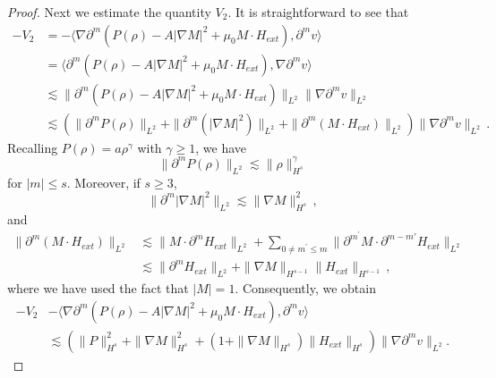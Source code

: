 \documentclass[reqno,11pt]{amsart}
\numberwithin{equation}{section}
\def\no{\nonumber}
\begin{document}
\begin{proof}
Next we estimate the quantity $V_2$. It is straightforward to see that
	\begin{align}\label{v2-eq0}
\no -V_2 & = - \langle \nabla \partial^m (P(\rho) - A |\nabla M|^2 + \mu_0 M \cdot H_{ext}), \partial^m v \rangle \\
\no & = \langle \partial^m (P(\rho) - A |\nabla M|^2 + \mu_0 M \cdot H_{ext}), \nabla \partial^m v \rangle \\
& \lesssim \|\partial^m (P(\rho) - A |\nabla M|^2 + \mu_0 M \cdot H_{ext})\|_{L^2} \|\nabla \partial^m v\|_{L^2} \\
\no & \lesssim \left( \|\partial^m P(\rho)\|_{L^2} + \|\partial^m (|\nabla M|^2)\|_{L^2} + \|\partial^m (M \cdot H_{ext})\|_{L^2} \right) \|\nabla \partial^m v\|_{L^2}\,.
	\end{align}
Recalling $P(\rho)=a\rho^\gamma $ with $ \gamma\geq1$, we have
$$\|\partial^m P(\rho)\|_{L^2} \lesssim \|\rho\|_{H^s}^\gamma$$
for $|m| \leq s$. Moreover, if $s \geq 3$,
$$\|\partial^m |\nabla M|^2\|_{L^2} \lesssim \|\nabla M\|_{H^s}^2 \,,$$
and
\begin{equation*}
	\begin{aligned}
\|\partial^m (M \cdot H_{ext})\|_{L^2} &\lesssim \|M \cdot \partial^m H_{ext}\|_{L^2} + \sum_{0 \neq m^{\prime} \leq m} \|\partial^{m^{\prime} } M \cdot \partial^{m - m'} H_{ext}\|_{L^2} \\
& \lesssim \|\partial^m H_{ext}\|_{L^2} + \|\nabla M\|_{H^{s-1}} \|H_{ext}\|_{H^{s - 1}}\,,
	\end{aligned}
\end{equation*}
where we have used the fact that $|M| = 1$. Consequently, we obtain
\begin{equation}\label{v2-eq}
	\begin{aligned}
-V_2&-\langle \nabla \partial^m (P(\rho) - A |\nabla M|^2 + \mu_0 M \cdot H_{ext}), \partial^m v \rangle \\&
\lesssim \left( \|P\|_{H^s}^2 + \|\nabla M\|_{H^s}^2 + (1+\|\nabla M\|_{H^s} )\|H_{ext}\|_{H^{s}} \right) \|\nabla \partial^m v\|_{L^2}.
	\end{aligned}
\end{equation}


\end{proof}
\end{document}
